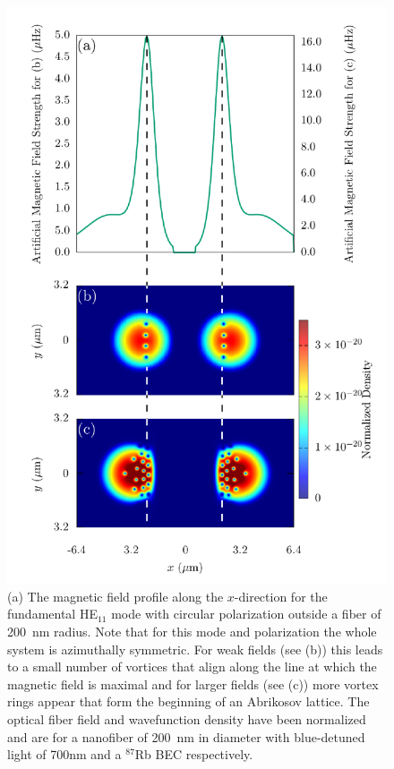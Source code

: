 \begin{figure}
\center \includegraphics[width=0.8\linewidth]{data/3d/vortex_line_all.pdf}
\caption{(a) The magnetic field profile along the $x$-direction for the fundamental HE$_{11}$ mode with circular polarization outside a fiber of 200~nm radius.
Note that for this mode and polarization the whole system is azimuthally symmetric.
For weak fields (see (b)) this leads to a small number of vortices that align along the line at which the magnetic field is maximal and for larger fields (see (c)) more vortex rings appear that form the beginning of an Abrikosov lattice.
The optical fiber field and wavefunction density have been normalized and are for a nanofiber of 200~nm in diameter with blue-detuned light of 700nm and a $^{87}$Rb BEC respectively.}
\label{fig:field_triangular}
\end{figure}


